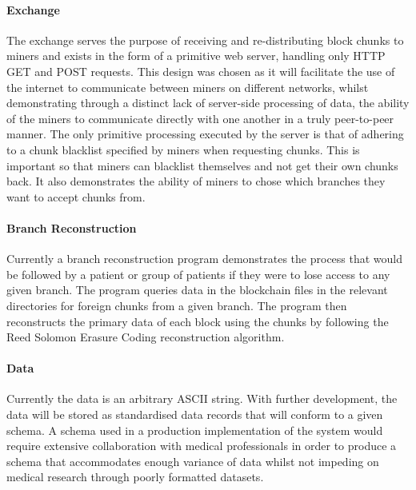 \documentclass[]{article}
\let\oldparagraph\paragraph
\renewcommand{\paragraph}[1]{\oldparagraph{#1}\mbox{}}
\begin{document}
\hypertarget{header-n103}{%
\paragraph{Exchange}\label{header-n103}}

The exchange serves the purpose of receiving and re-distributing block
chunks to miners and exists in the form of a primitive web server,
handling only HTTP GET and POST requests. This design was chosen as it
will facilitate the use of the internet to communicate between miners on
different networks, whilst demonstrating through a distinct lack of
server-side processing of data, the ability of the miners to communicate
directly with one another in a truly peer-to-peer manner. The only
primitive processing executed by the server is that of adhering to a
chunk blacklist specified by miners when requesting chunks. This is
important so that miners can blacklist themselves and not get their own
chunks back. It also demonstrates the ability of miners to chose which
branches they want to accept chunks from.

\hypertarget{header-n105}{%
\paragraph{Branch Reconstruction}\label{header-n105}}

Currently a branch reconstruction program demonstrates the process that
would be followed by a patient or group of patients if they were to lose
access to any given branch. The program queries data in the blockchain
files in the relevant directories for foreign chunks from a given
branch. The program then reconstructs the primary data of each block
using the chunks by following the Reed Solomon Erasure Coding
reconstruction algorithm.

\hypertarget{header-n107}{%
\paragraph{Data}\label{header-n107}}

Currently the data is an arbitrary ASCII string. With further
development, the data will be stored as standardised data records that
will conform to a given schema. A schema used in a production
implementation of the system would require extensive collaboration with
medical professionals in order to produce a schema that accommodates
enough variance of data whilst not impeding on medical research through
poorly formatted datasets.
\end{document}
